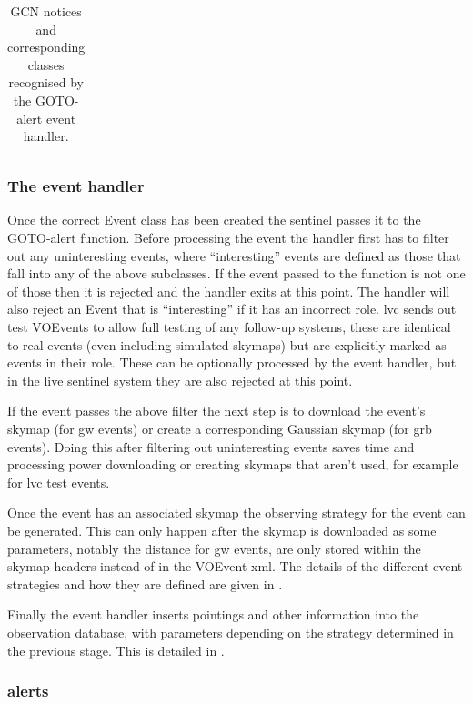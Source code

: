 \begin{colsection}
\begin{colsection}
\begin{table}[t]
\begin{center}
\begin{tabular}{clll}
\end{tabular}
\end{center}
\caption[GCN notices recognised by the GOTO-alert event handler]{GCN notices and corresponding classes recognised by the GOTO-alert event handler.}
\label{tab:events}
\end{table}

\subsubsection{The event handler}

Once the correct Event class has been created the sentinel passes it to the GOTO-alert  function. Before processing the event the handler first has to filter out any uninteresting events, where ``interesting'' events are defined as those that fall into any of the above subclasses. If the event passed to the function is not one of those then it is rejected and the handler exits at this point. The handler will also reject an Event that is ``interesting'' if it has an incorrect role. \gls{lvc} sends out test VOEvents to allow full testing of any follow-up systems, these are identical to real events (even including simulated skymaps) but are explicitly marked as  events in their role. These can be optionally processed by the event handler, but in the live sentinel system they are also rejected at this point.

If the event passes the above filter the next step is to download the event's skymap (for \gls{gw} events) or create a corresponding Gaussian skymap (for \gls{grb} events). Doing this after filtering out uninteresting events saves time and processing power downloading or creating skymaps that aren't used, for example for \gls{lvc} test events.

Once the event has an associated skymap the observing strategy for the event can be generated. This can only happen after the skymap is downloaded as some parameters, notably the distance for \gls{gw} events, are only stored within the skymap headers instead of in the VOEvent \gls{xml}. The details of the different event strategies and how they are defined are given in .

Finally the event handler inserts pointings and other information into the observation database, with parameters depending on the strategy determined in the previous stage. This is detailed in .

\subsubsection{ alerts}


\end{colsection}
\end{colsection}
